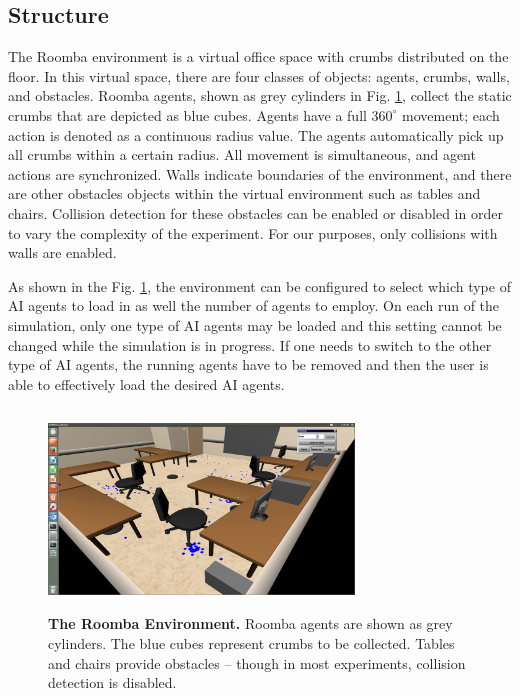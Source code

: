 \documentclass[conference]{IEEEtran}
\begin{document}
\subsection{Structure}

The Roomba environment is a virtual office space with crumbs distributed on
the floor.
In this virtual space, there are four classes of objects: agents, crumbs, walls,
and obstacles. 
Roomba agents, shown as grey cylinders in Fig. \ref{roomba:world}, collect the static crumbs that are depicted as blue cubes.  
Agents have a full $360^\circ$ movement; each action is
denoted as a continuous radius value. The
agents automatically pick up all crumbs within a certain radius.
All movement is simultaneous, and agent actions are synchronized.  
Walls indicate boundaries of the environment, and there are other obstacles objects within the virtual environment such as tables and chairs. Collision detection for these obstacles can be enabled or disabled in order to vary the complexity of the experiment. For our purposes, only collisions with walls are enabled.

As shown in the Fig. \ref{roomba:world}, the environment can be configured to select which type of AI agents to load in as well the
number of agents to employ. On each run of the
simulation, only one type of AI agents may be loaded and this setting cannot be changed while the simulation is in progress. 
If one needs to switch to the other type of AI agents, the running agents have
to be removed and then the user is able to effectively load the desired AI agents.

\begin{figure}[!t]
\centering
\includegraphics[width=3.2in,height=2.1in]{./figures/roombas/roomba2.png}
\caption{\textbf{The Roomba Environment.} Roomba agents are shown as grey cylinders. The blue cubes represent crumbs to be collected. Tables and chairs provide obstacles -- though in most experiments, collision detection is disabled.} 
\label{roomba:world}
\end{figure}
\end{document}
